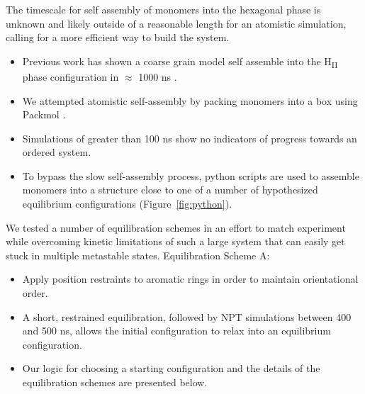 \documentclass{article}
\begin{document}
  The timescale for self assembly of monomers into the hexagonal phase is
  unknown and likely outside of a reasonable length for an atomistic
  simulation, calling for a more efficient way to build the system. 
  \begin{itemize}
    \item Previous work has shown a coarse grain model self assemble into
    the H\textsubscript{II} phase configuration in $\approx$ 1000 ns \cite{mondal_self-assembly_2013}.
    \item We attempted atomistic self-assembly by packing monomers into a box 
    using Packmol \cite{martinez_packmol:_2009}.
    \item Simulations of greater than 100 ns show no indicators of progress 
    towards an ordered system.
    \item To bypass the slow self-assembly process, python scripts are used
    to assemble monomers into a structure close 
    to one of a number of hypothesized equilibrium configurations (Figure~\ref{fig:python}).
   \end{itemize}

  We tested a number of equilibration schemes in an effort to match experiment
  while overcoming kinetic limitations of such a large system that can easily
  get stuck in multiple metastable states.
    Equilibration Scheme A:
  \begin{itemize}
    \item Apply position restraints to aromatic rings in order to maintain
    orientational order. 
    \item A short, restrained equilibration, followed by NPT simulations 
    between 400 and 500 ns, allows the initial configuration to relax into
    an equilibrium configuration.
    \item Our logic for choosing a starting configuration and the details 
    of the equilibration schemes are presented below.
  \end{itemize}
  
\end{document}
